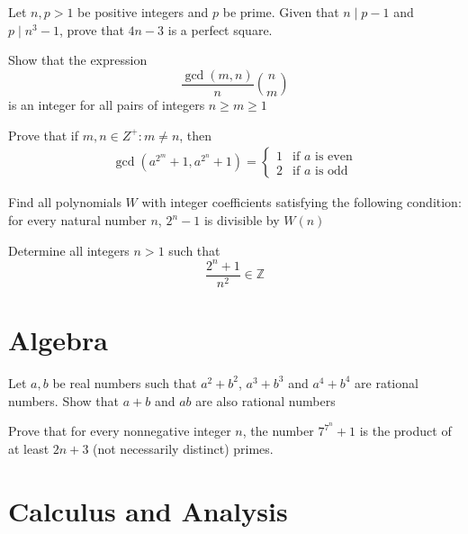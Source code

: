 \begin{problem}[N][3][Iran 2005]
    Let $n,p>1$ be positive integers and $p$ be prime. Given that $n \mid p-1$ and $p \mid n^3-1$, prove that $4n-3$ is a perfect square.
\end{problem}

\begin{problem}[N][5][Putnam 2000]
    Show that the expression 
    $$ \frac{\gcd(m,n)}{n} \binom{n}{m} $$
    is an integer for all pairs of integers $n \geq m \geq 1$
\end{problem}

\begin{problem}
    Prove that if $m,n \in Z^+: m \neq n$, then
    \begin{align*}
        \gcd \left(a^{2^m}+1, a^{2^n}+1\right) = 
        \begin{cases}
            1 & \text{if } a \text{ is even} \\
            2 & \text{if } a \text{ is odd}
        \end{cases}
    \end{align*}
\end{problem}

\begin{problem}[N][6][Polish 2003]
    Find all polynomials $W$ with integer coefficients satisfying the following condition: for every natural number $n$, $2^n-1$ is divisible by $W(n)$
\end{problem}

\begin{problem}[N][8][IMO 1990]
    Determine all integers $n>1$ such that
    $$\frac{2^n+1}{n^2} \in \mathbb{Z}$$
\end{problem}

\newpage

\section{Algebra}

\begin{problem}[A][4]
    Let $a,b$ be real numbers such that  $a^2+b^2$, $a^3+b^3$ and $a^4+b^4$ are rational numbers. Show that $a+b$ and $ab$ are also rational numbers
\end{problem}

\begin{problem}[A][9][USAMO 2007]
    Prove that for every nonnegative integer $n$, the number $7^{7^n}+1$ is the product of at least $2n + 3$ (not necessarily distinct) primes.
\end{problem}



\newpage

\section{Calculus and Analysis}










